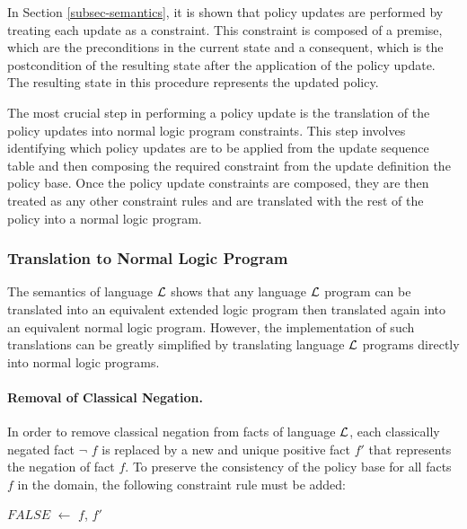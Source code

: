 \documentclass[11pt, twocolumn]{article}
\newenvironment{vquote}
  {\begin{list}{}{\leftmargin 1em}\item[]}
  {\end{list}}
\begin{document}
        In Section \ref{subsec-semantics}, it is shown that policy updates are
        performed by treating each update as a constraint. This constraint is
        composed of a premise, which are the preconditions in the current state
        and a consequent, which is the postcondition of the resulting state
        after the application of the policy update. The resulting state in this
        procedure represents the updated policy.

        The most crucial step in performing a policy update is the translation
        of the policy updates into normal logic program constraints. This step
        involves identifying which policy updates are to be applied from the
        update sequence table and then composing the required constraint from
        the update definition the policy base. Once the policy update
        constraints are composed, they are then treated as any other
        constraint rules and are translated with the rest of the policy into
        a normal logic program.

      \subsubsection{Translation to Normal Logic Program}

        The semantics of language ${\cal L}$ shows that any language
        ${\cal L}$ program can be translated into an equivalent extended logic
        program then translated again into an equivalent normal logic program.
        However, the implementation of such translations can be greatly
        simplified by translating language ${\cal L}$ programs directly into
        normal logic programs.

        \paragraph{Removal of Classical Negation.}

          In order to remove classical negation from facts of language
          ${\cal L}$, each classically negated fact $\lnot$ $f$ is replaced by
          a new and unique positive fact $f'$ that represents the negation of
          fact $f$. To preserve the consistency of the policy base for all
          facts $f$ in the domain, the following constraint rule must be added:

          \begin{vquote}
            $FALSE$ $\leftarrow$ $f$, $f'$
          \end{vquote}
\end{document}
